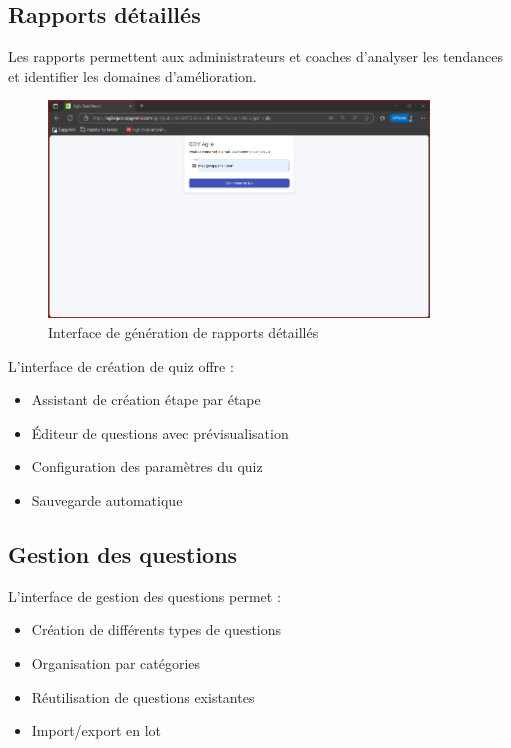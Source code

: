 \documentclass[12pt,a4paper]{report}
\begin{document}
\subsection{Rapports détaillés}

Les rapports permettent aux administrateurs et coaches d'analyser les tendances et identifier les domaines d'amélioration.

\begin{figure}[H]
\centering
\includegraphics[width=0.9\textwidth]{latex_media/media/image62.png}
\caption{Interface de génération de rapports détaillés}
\label{fig:rapports-detailles}
\end{figure}

L'interface de création de quiz offre :

\begin{itemize}
    \item Assistant de création étape par étape
    \item Éditeur de questions avec prévisualisation
    \item Configuration des paramètres du quiz
    \item Sauvegarde automatique
\end{itemize}

\subsection{Gestion des questions}

L'interface de gestion des questions permet :

\begin{itemize}
    \item Création de différents types de questions
    \item Organisation par catégories
    \item Réutilisation de questions existantes
    \item Import/export en lot
\end{itemize}
\end{document}
